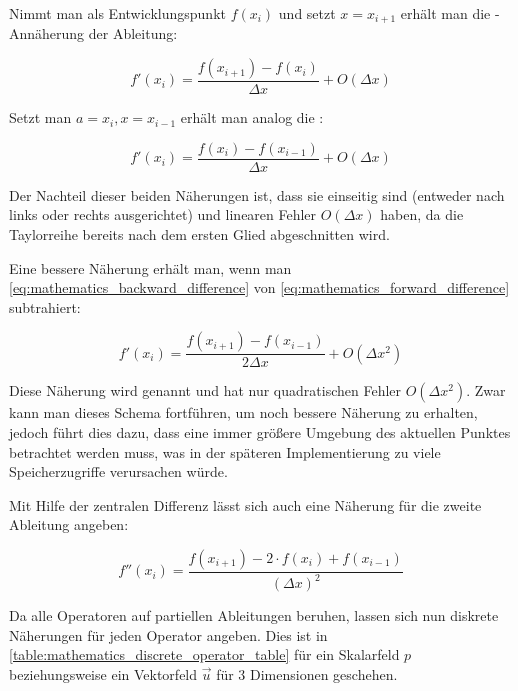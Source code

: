 Nimmt man als Entwicklungspunkt $f(x_i)$ und setzt $x=x_{i+1}$ erhält man die
-Annäherung der Ableitung:

\begin{equation}
\label{eq:mathematics_forward_difference}
f'(x_i) = \frac{f(x_{i+1}) - f(x_i)}{\Delta x} + O(\Delta x)
\end{equation}

Setzt man $a=x_i,x=x_{i-1}$ erhält man analog die
:

\begin{equation}
\label{eq:mathematics_backward_difference}
f'(x_i) = \frac{f(x_i) - f(x_{i-1})}{\Delta x} + O(\Delta x)
\end{equation}

Der Nachteil dieser beiden Näherungen ist, dass sie einseitig sind (entweder
nach links oder rechts ausgerichtet) und linearen Fehler $O(\Delta x)$ haben, da
die Taylorreihe bereits nach dem ersten Glied abgeschnitten wird.

Eine bessere Näherung erhält man, wenn man
\cref{eq:mathematics_backward_difference} von
\cref{eq:mathematics_forward_difference} subtrahiert:

\begin{equation}
f'(x_i) = \frac{f(x_{i+1}) - f(x_{i-1})}{2 \Delta x} + O(\Delta x^2)
\end{equation}

Diese Näherung wird  genannt und
hat nur quadratischen Fehler $O(\Delta x^2)$. Zwar kann man dieses Schema
fortführen, um noch bessere Näherung zu erhalten, jedoch führt
dies dazu, dass eine immer größere Umgebung des aktuellen
Punktes betrachtet werden muss, was in der späteren Implementierung zu
viele Speicherzugriffe verursachen würde.

Mit Hilfe der zentralen Differenz lässt sich auch eine Näherung für die zweite
Ableitung angeben:

\begin{equation}
f''(x_i)
=
\frac
{
	f(
		x_{i+1}) -
	2 \cdot
	f(
		x_i)
	+
	f(
		x_{i-1})
}
{
	{(\Delta x)}^2
}
\end{equation}

Da alle Operatoren auf partiellen Ableitungen beruhen, lassen sich nun
diskrete Näherungen für jeden Operator angeben. Dies ist in
\cref{table:mathematics_discrete_operator_table} für ein Skalarfeld
$p$ beziehungsweise ein Vektorfeld $\vec{u}$ für 3 Dimensionen
geschehen.

